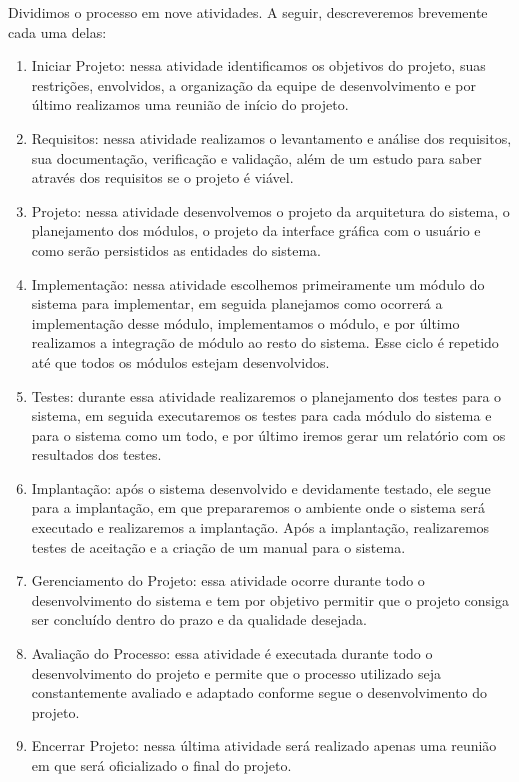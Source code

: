 Dividimos o processo em nove atividades. A seguir, descreveremos brevemente cada uma delas:
\begin{enumerate}
	\item Iniciar Projeto: nessa atividade identificamos os objetivos do projeto, suas restri\c{c}\~oes, envolvidos, a organiza\c{c}\~ao da equipe de desenvolvimento e por \'ultimo realizamos uma 
reuni\~ao de in\'icio do projeto.
	\item Requisitos: nessa atividade realizamos o levantamento e an\'alise dos requisitos, sua documenta\c{c}\~ao, verifica\c{c}\~ao e valida\c{c}\~ao, al\'em de um estudo para saber atrav\'es dos 
requisitos se o projeto \'e vi\'avel. 
	\item Projeto: nessa atividade desenvolvemos o projeto da arquitetura do sistema, o planejamento dos m\'odulos, o projeto da interface gr\'afica com o usu\'ario  e como ser\~ao persistidos as 
entidades do sistema.
	\item Implementação: nessa atividade escolhemos primeiramente um m\'odulo do sistema para implementar, em seguida planejamos como ocorrer\'a a implementa\c{c}\~ao desse 
m\'odulo, implementamos o m\'odulo, e por \'ultimo realizamos a integra\c{c}\~ao de m\'odulo ao resto do sistema. Esse ciclo \'e repetido at\'e que todos os m\'odulos estejam desenvolvidos.
	\item Testes: durante essa atividade realizaremos o planejamento dos testes para o sistema, em seguida executaremos os testes para cada m\'odulo do sistema e para o sistema como um todo, e 
por \'ultimo iremos gerar um relat\'orio com os resultados dos testes.
	\item Implantação: ap\'os o sistema desenvolvido e devidamente testado, ele segue para a implanta\c{c}\~ao, em que prepararemos o ambiente onde o sistema ser\'a executado e realizaremos a 
implanta\c{c}\~ao. Ap\'os a implanta\c{c}\~ao, realizaremos testes de aceita\c{c}\~ao e a cria\c{c}\~ao de um manual para o sistema.
	\item Gerenciamento do Projeto: essa atividade ocorre durante todo o desenvolvimento do sistema e tem por objetivo permitir que o projeto consiga ser conclu\'ido dentro do prazo e da qualidade 
desejada.
	\item Avalia\c{c}\~ao do Processo: essa atividade \'e executada durante todo o desenvolvimento do projeto e permite que o processo utilizado seja constantemente avaliado e adaptado conforme segue 
o desenvolvimento do projeto.
	\item Encerrar Projeto: nessa \'ultima atividade ser\'a realizado apenas uma reuni\~ao em que ser\'a oficializado o final do projeto.
\end{enumerate}

